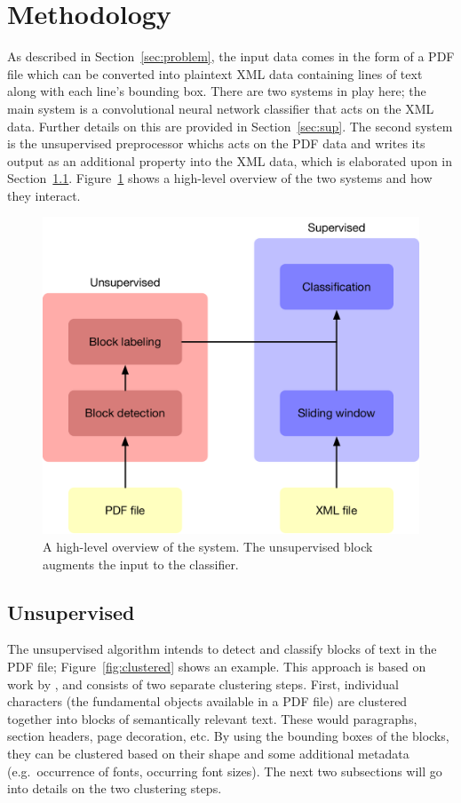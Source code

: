 \section{Methodology}
\label{sec:method}

As described in Section~\ref{sec:problem}, the input data comes in the form of a
PDF file which can be converted into plaintext XML data containing lines of text
along with each line's bounding box. There are two systems in play here; the
main system is a convolutional neural network classifier that acts on the XML
data. Further details on this are provided in Section~\ref{sec:sup}. The second
system is the unsupervised preprocessor whichs acts on the PDF data and writes
its output as an additional property into the XML data, which is elaborated upon
in Section~\ref{sec:unsup}. Figure~\ref{fig:overview} shows a high-level
overview of the two systems and how they interact.

\begin{figure}[htb]
  \centering
  \includegraphics[width=\textwidth]{figures/layout.pdf}
  \caption{A high-level overview of the system. The unsupervised block augments
  the input to the classifier.}
  \label{fig:overview}
\end{figure}

\subsection{Unsupervised}
\label{sec:unsup}
The unsupervised algorithm intends to detect and classify blocks of text in the
PDF file; Figure~\ref{fig:clustered} shows an example. This approach is based on
work by \textcite{klampfl2014unsupervised}, and consists of two separate
clustering steps. First, individual characters (the fundamental objects
available in a PDF file) are clustered together into blocks of semantically
relevant text. These would paragraphs, section headers, page decoration, etc. By
using the bounding boxes of the blocks, they can be clustered based on their
shape and some additional metadata (e.g.\ occurrence of fonts, occurring font
sizes). The next two subsections will go into details on the two clustering
steps.

